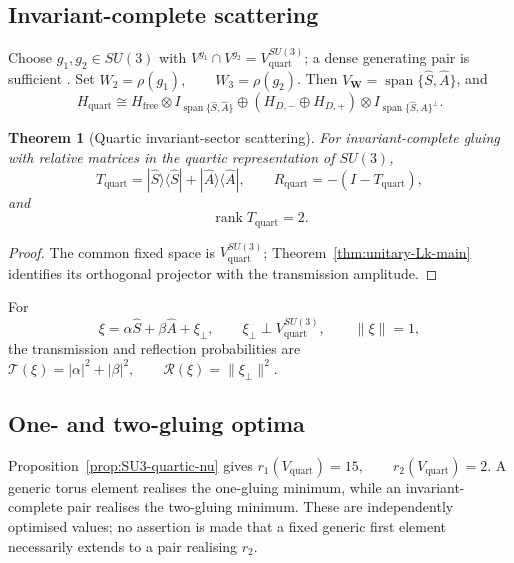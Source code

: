 \documentclass[11pt]{article}
\theoremstyle{plain}
\newtheorem{theorem}{Theorem}[section]
\theoremstyle{definition}
\begin{document}
\subsection{Invariant-complete scattering}

Choose \(g_1,g_2\in SU(3)\) with
\(V^{g_1}\cap V^{g_2} = V_{\mathrm{quart}}^{SU(3)}\);
a dense generating pair is sufficient
\citep{BreuillardGelander2003,BreuillardGelander2026Revisited}. Set
\(W_2=\rho(g_1), \qquad W_3=\rho(g_2)\).
Then
\(V_{\mathbf W} = \operatorname{span}\{\widehat S,\widehat A\}\),
and
\[
H_{\mathrm{quart}}
\cong
H_{\mathrm{free}}\otimes
I_{\operatorname{span}\{\widehat S,\widehat A\}}
\oplus
(H_{D,-}\oplus H_{D,+})
\otimes
I_{\operatorname{span}\{\widehat S,\widehat A\}^{\perp}}.
\]

\begin{theorem}[Quartic invariant-sector scattering]
\label{thm:quartic-scattering}
For invariant-complete gluing with relative matrices in the quartic representation of \(SU(3)\),
\[
T_{\mathrm{quart}}
=
|\widehat S\rangle\langle\widehat S|
+
|\widehat A\rangle\langle\widehat A|,
\qquad
R_{\mathrm{quart}}
=
-\left(I-T_{\mathrm{quart}}\right),
\]
and
\[
\operatorname{rank}T_{\mathrm{quart}}=2.
\]
\end{theorem}

\begin{proof}
The common fixed space is \(V_{\mathrm{quart}}^{SU(3)}\); Theorem~\ref{thm:unitary-Lk-main} identifies its orthogonal projector with the transmission amplitude.
\end{proof}

For
\[
\xi=\alpha\widehat S+\beta\widehat A+\xi_\perp,
\qquad
\xi_\perp\perp V_{\mathrm{quart}}^{SU(3)},
\qquad
\|\xi\|=1,
\]
the transmission and reflection probabilities are
\(\mathcal T(\xi)=|\alpha|^2+|\beta|^2, \qquad \mathcal R(\xi)=\|\xi_\perp\|^2\).

\subsection{One- and two-gluing optima}

Proposition~\ref{prop:SU3-quartic-nu} gives
\(r_1(V_{\mathrm{quart}})=15, \qquad r_2(V_{\mathrm{quart}})=2\).
A generic torus element realises the one-gluing minimum, while an invariant-complete pair realises the two-gluing minimum. These are independently optimised values; no assertion is made that a fixed generic first element necessarily extends to a pair realising \(r_2\).
\end{document}

